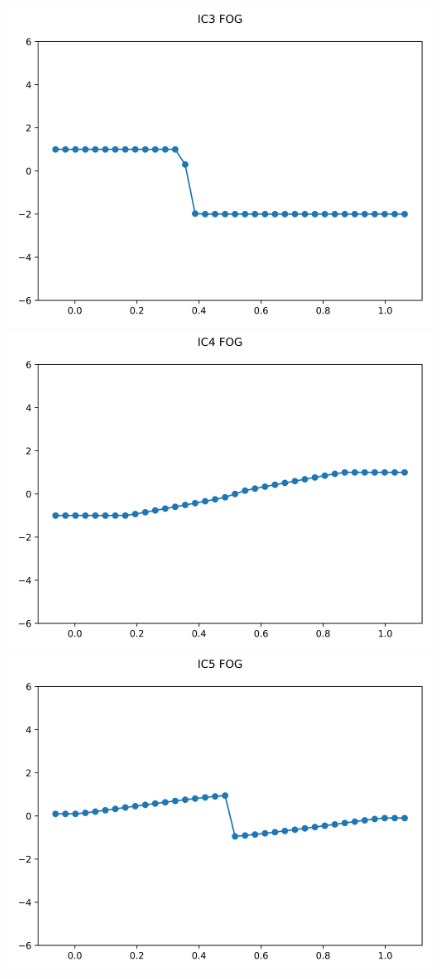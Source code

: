 \documentclass{article}
\begin{document}
\begin{figure}[t]
        \includegraphics[width=.95\textwidth]{../../code/IC3Methodfu_plot.png}
        \includegraphics[width=.95\textwidth]{../../code/IC4Methodfu_plot.png}
        \includegraphics[width=.95\textwidth]{../../code/IC5Methodfu_plot.png}

\end{figure}
\end{document}
